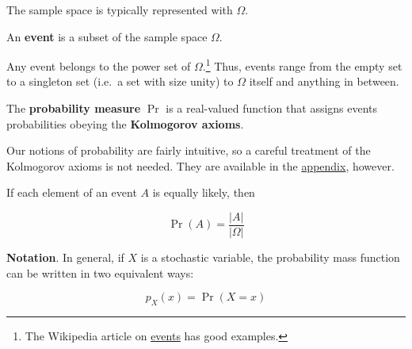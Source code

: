 \documentclass[13pt,oneside]{tufte-book}
\theoremstyle{definition}
\theoremstyle{definition}
\theoremstyle{definition}
\theoremstyle{remark}
\let\BeginKnitrBlock\begin \let\EndKnitrBlock\end
\begin{document}
\begin{marginfigure}
The sample space is typically represented with \(\Omega\).
\end{marginfigure}

\BeginKnitrBlock{definition}[Event]
\protect\hypertarget{def:unnamed-chunk-9}{}{\label{def:unnamed-chunk-9}
{} } An \textbf{event} is a subset of the sample
space \(\Omega\).
\EndKnitrBlock{definition}

\BeginKnitrBlock{remark}
{} Any event belongs to the power set of
\(\Omega\).\footnote{The Wikipedia article on
  \href{https://en.wikipedia.org/wiki/Event_(probability_theory)\#A_simple_example}{events}
  has good examples.} Thus, events range from the empty set to a
singleton set (i.e.~a set with size unity) to \(\Omega\) itself and
anything in between.
\EndKnitrBlock{remark}

\begin{marginfigure}
\end{marginfigure}

\BeginKnitrBlock{definition}[Probability Measure]
\protect\hypertarget{def:unnamed-chunk-12}{}{\label{def:unnamed-chunk-12}
{} } The \textbf{probability measure}
\(\Pr\) is a real-valued function that assigns events probabilities
obeying the \textbf{Kolmogorov axioms}.
\EndKnitrBlock{definition}

\BeginKnitrBlock{remark}
{} Our notions of probability are fairly
intuitive, so a careful treatment of the Kolmogorov axioms is not
needed. They are available in the \protect\hyperlink{kmaxm}{appendix},
however.
\EndKnitrBlock{remark}

If each element of an event \(A\) is equally likely, then

\[
\Pr(A) = \frac{|A|}{|\Omega|}
\]

\begin{marginfigure}
\textbf{Notation}. In general, if \(X\) is a stochastic variable, the
probability mass function can be written in two equivalent ways:

\begin{equation}
p_X(x) = \Pr(X=x)
\label{eq:prob-notation}
\end{equation}
\end{marginfigure}
\end{document}
